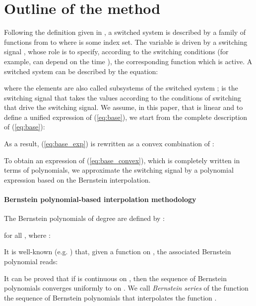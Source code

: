 \documentclass[12pt]{article}
\begin{document}
\section{Outline of the method}


Following the definition given in \cite{Liber}, a switched system is described by a family  of functions from  to  where 
 is some index set. The variable  is driven by a switching signal , whose role is to specify, according to the switching conditions (for example,  can 
depend on the time ), the corresponding  function which is active. A switched system can be described by the equation:



\noindent
where the elements  are also called subsystems of the switched system  ;  is the switching signal that takes the values  according to 
the conditions of switching that drive the switching signal.
We assume, in this paper, that  is linear and to define a unified expression of (\ref{eq:base}), we start from the complete description of (\ref{eq:base}):



\noindent
As a result, (\ref{eq:base_exp}) is rewritten as a convex combination of  :



\noindent
To obtain an expression of (\ref{eq:base_convex}), which is completely written in terms of polynomials, we approximate the switching signal  by a polynomial expression 
based on the Bernstein interpolation.

\paragraph{Bernstein polynomial-based interpolation methodology}


The Bernstein polynomials of degree  are defined by :



\noindent
for all , where :



\noindent
It is well-known (e.g. \cite{Philips}) that, given a function  on , the associated Bernstein polynomial reads:

\noindent


\noindent
It can be proved that if  is continuous on , then the sequence of Bernstein polynomials converges uniformly to  on .
\noindent
We call {\it Bernstein series} of the function  the sequence of Bernstein polynomials that interpolates the function .
\end{document}
